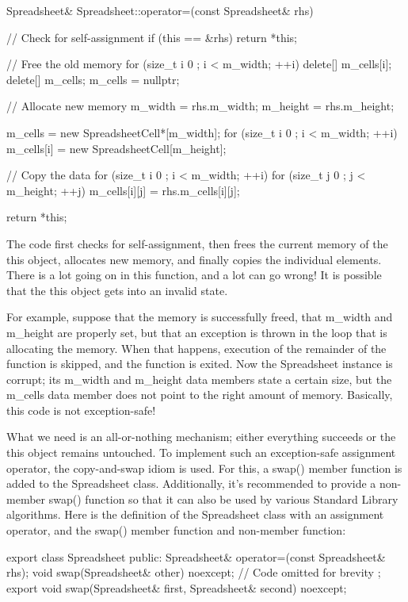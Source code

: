 \begin{cpp}
Spreadsheet& Spreadsheet::operator=(const Spreadsheet& rhs)
{
    // Check for self-assignment
    if (this == &rhs) {
        return *this;
    }

    // Free the old memory
    for (size_t i { 0 }; i < m_width; ++i) {
        delete[] m_cells[i];
    }
    delete[] m_cells;
    m_cells = nullptr;

    // Allocate new memory
    m_width = rhs.m_width;
    m_height = rhs.m_height;

    m_cells = new SpreadsheetCell*[m_width];
    for (size_t i { 0 }; i < m_width; ++i) {
        m_cells[i] = new SpreadsheetCell[m_height];
    }

    // Copy the data
    for (size_t i { 0 }; i < m_width; ++i) {
        for (size_t j { 0 }; j < m_height; ++j) {
            m_cells[i][j] = rhs.m_cells[i][j];
        }
    }

    return *this;
}
\end{cpp}

The code first checks for self-assignment, then frees the current memory of the this object, allocates new memory, and finally copies the individual elements. There is a lot going on in this function, and a lot can go wrong! It is possible that the this object gets into an invalid state.

For example, suppose that the memory is successfully freed, that m\_width and m\_height are properly set, but that an exception is thrown in the loop that is allocating the memory. When that happens, execution of the remainder of the function is skipped, and the function is exited. Now the Spreadsheet instance is corrupt; its m\_width and m\_height data members state a certain size, but the m\_cells data member does not point to the right amount of memory. Basically, this code is not exception-safe!

What we need is an all-or-nothing mechanism; either everything succeeds or the this object remains untouched. To implement such an exception-safe assignment operator, the copy-and-swap idiom is used. For this, a swap() member function is added to the Spreadsheet class. Additionally, it’s recommended to provide a non-member swap() function so that it can also be used by various Standard Library algorithms. Here is the definition of the Spreadsheet class with an assignment operator, and the swap() member function and non-member function:

\begin{cpp}
export class Spreadsheet
{
    public:
        Spreadsheet& operator=(const Spreadsheet& rhs);
        void swap(Spreadsheet& other) noexcept;
        // Code omitted for brevity
};
export void swap(Spreadsheet& first, Spreadsheet& second) noexcept;
\end{cpp}

